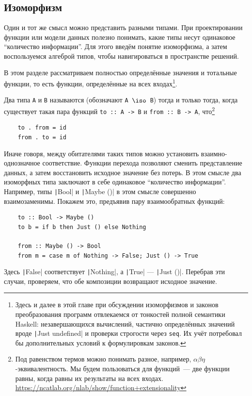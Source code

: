 \subsection{Изоморфизм} \label{subsec:isomorphism}

Один и тот же смысл можно представить разными типами.
При проектировании функции или модели данных полезно понимать, какие типы несут одинаковое ``количество информации''.
Для этого введём понятие изоморфизма, а затем воспользуемся алгеброй типов, чтобы навигироваться в пространстве решений.

В этом разделе рассматриваем полностью определённые значения и тотальные функции, то есть функции, определённые на всех входах\footnote{Здесь и далее в этой главе при обсуждении изоморфизмов и законов преобразования программ отвлекаемся от тонкостей полной семантики Haskell: незавершающихся вычислений, частично определённых значений вроде \texttt|Just undefined| и проверки строгости через \texttt{seq}. Их учёт потребовал бы дополнительных условий к формулировкам законов.}.

Два типа \texttt{A} и \texttt{B} называются  (обозначают \texttt{A $\iso$ B}) тогда и только тогда, когда существует такая пара функций \texttt{to :: A -> B} и \texttt{from :: B -> A}, что\footnote{Под равенством термов можно понимать разное, например, $\alpha\beta\eta$-эквивалентность. Мы будем пользоваться  для функций~--- две функции равны, когда равны их результаты на всех входах. \url{https://ncatlab.org/nlab/show/function+extensionality}}
\begin{verbatim}
    to . from = id
    from . to = id
\end{verbatim}

Иначе говоря, между обитателями таких типов можно установить взаимно-однозначное соответствие.
Функции перехода позволяют сменить представление данных, а затем восстановить исходное значение без потерь.
В этом смысле два изоморфных типа заключают в себе одинаковое ``количество информации''.
Например, типы \texttt|Bool| и \texttt|Maybe ()| в этом смысле совершенно взаимозаменимы.
Покажем это, предъявив пару взаимообратных функций:
\begin{verbatim}
    to :: Bool -> Maybe ()
    to b = if b then Just () else Nothing

    from :: Maybe () -> Bool
    from m = case m of Nothing -> False; Just () -> True
\end{verbatim}
Здесь \texttt|False| соответствует \texttt|Nothing|, а \texttt|True| --- \texttt|Just ()|.
Перебрав эти случаи, проверяем, что обе композиции возвращают исходное значение.

